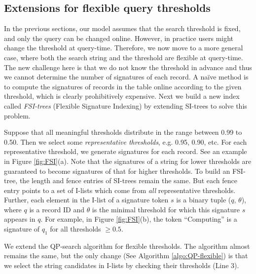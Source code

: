 \subsection{Extensions for flexible query thresholds} \label{subsec:flexible}

In the previous sections, our model assumes that the search threshold is fixed, and only the query can be changed online. However, in practice users might change the threshold at query-time. Therefore, we now move to a more general case, where both the search string and the threshold are flexible at query-time. The new challenge here is that we do not know the threshold in advance and thus we cannot determine the number of signatures of each record. A na\"{i}ve method is to compute the signatures of records in the table online according to the given threshold, which  is clearly prohibitively expensive. Next we build a new index called \textit{FSI-trees} (Flexible Signature Indexing) by extending SI-trees to solve this problem.

Suppose that all meaningful thresholds distribute in the range between 0.99 to 0.50. Then we select some \textit{representative thresholds}, e.g. 0.95, 0.90, etc.   For each representative threshold, we generate signatures for each record. See an example in Figure \ref{fig:FSI}(a). Note that the signatures of a string for lower thresholds are guaranteed to become signatures of that for higher thresholds. To build an FSI-tree,  the length and fence entries of SI-trees remain the same. But each fence entry points to a set of I-lists which come from \textit{all} representative thresholds. Further, each element in the I-list of a signature token $s$ is a binary tuple ($q$, $\theta$), where $q$ is a record ID and $\theta$ is the minimal threshold for which this signature $s$ appears in $q$. For example, in Figure \ref{fig:FSI}(b), the token ``\textsf{Computing}''  is a signature of $q_1$ for all thresholds $\geq 0.5$.

We extend the QP-search algorithm for flexible thresholds. The algorithm almost remains the same, but  the only  change (See Algorithm \ref{algo:QP-flexible}) is that we select the string candidates in I-lists by checking their thresholds (Line 3).

